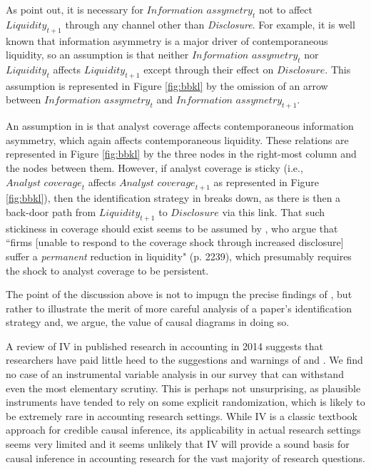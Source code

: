 \documentclass[11pt,reqno]{amsart}
\begin{document}
\begin{doublespace}
As \citet{Balakrishnan:2014js} point out, it is necessary for $\textit{Information assymetry}_t$ not to affect $\textit{Liquidity}_{t+1}$ through any channel other than \textit{Disclosure}.
For example, it is well known that information asymmetry is a major driver of contemporaneous liquidity, so an assumption is that neither $\textit{Information assymetry}_t$ nor $\textit{Liquidity}_t$ affects $\textit{Liquidity}_{t+1}$ except through their effect on $\textit{Disclosure}$. 
This assumption is represented in Figure \ref{fig:bbkl} by the omission of an arrow between $\textit{Information assymetry}_t$ and $\textit{Information assymetry}_{t+1}$.

An assumption in \citet{Kelly:2012ih} is that analyst coverage affects contemporaneous information asymmetry, which again affects contemporaneous liquidity.
These relations are represented in Figure \ref{fig:bbkl} by the three nodes in the right-most column and the nodes between them.
However, if analyst coverage is sticky (i.e., $\textit{Analyst coverage}_t$ affects $\textit{Analyst coverage}_{t+1}$ as represented in Figure \ref{fig:bbkl}), then the identification strategy in \citet{Balakrishnan:2014js} breaks down, as there is then a back-door path from $\textit{Liquidity}_{t+1}$ to $\textit{Disclosure}$ via this link.
That such stickiness in coverage should exist seems to be assumed by \citet{Balakrishnan:2014js}, who argue that ``firms [unable to respond  to the coverage shock through increased disclosure] suffer a \emph{permanent} reduction in liquidity" (p. 2239), which presumably requires the shock to analyst coverage to be persistent.

The point of the discussion above is not to impugn the precise findings of \citet{Balakrishnan:2014js}, but rather to illustrate the merit of more careful analysis of a paper's identification strategy and, we argue, the value of causal diagrams in doing so.

A review of IV in published research in accounting in 2014 suggests that researchers have paid little heed to the suggestions and warnings of  \citet{Larcker:2010fq} and \citet{Roberts:2013cz}.
We find no case of an instrumental variable analysis in our survey that can withstand even the most elementary scrutiny.
This is perhaps not unsurprising, as plausible instruments have tended to rely on some explicit randomization, which is likely to be extremely rare in accounting research settings.
While IV is a classic textbook approach for credible causal inference, its applicability in actual research settings seems very limited and it seems unlikely that IV will provide a sound basis for causal inference in accounting research for the vast majority of research questions.
 

\end{doublespace}
\end{document}
